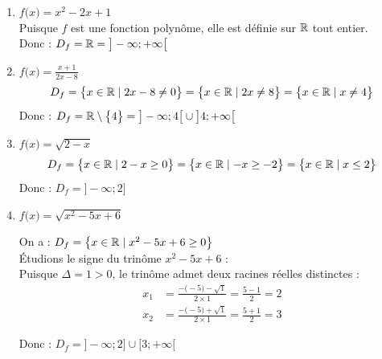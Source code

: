 \documentclass[10pt, a4paper]{article}
\begin{document}
\begin{Solution}[APPLICATION][1]
\begin{enumerate}[leftmargin=*,itemsep=0.5pt]

    \item $f\big( x \big) = x^2 - 2x + 1$ \\
    Puisque $f$ est une fonction polynôme, elle est définie sur $\mathbb{R}$ tout entier. \\
    Donc : \quad $D_f = \mathbb{R} = \big] -\infty ; +\infty \big[ $

    \item  $f\big( x \big) = \frac{x+1}{2x-8}$
         $$D_f = \big\{ x \in \mathbb{R} \mid 2x - 8 \neq 0 \big\} 
             = \big\{ x \in \mathbb{R} \mid 2x  \neq 8 \big\} 
             = \big\{ x \in \mathbb{R} \mid x  \neq 4 \big\}$$
    Donc : \quad $D_f = \mathbb{R} \setminus \big\{ 4 \big\} = \big] -\infty ; 4 \big[ \cup \big] 4 ; +\infty \big[$ 

    \item  $f\big( x \big) = \sqrt{2-x}$
    \begin{align*}
        D_f = \big\{ x \in \mathbb{R} \mid 2 - x \geq 0 \big\}
         = \big\{ x \in \mathbb{R} \mid  - x \geq -2 \big\}
         = \big\{ x \in \mathbb{R} \mid x \leq 2 \big\}
    \end{align*}
    Donc : \quad  $D_f = \big] -\infty ; 2 \big]$ 

    \item $f\big( x \big) = \sqrt{x^2 - 5x + 6}$
    
    On a : \quad $D_f = \big\{ x \in \mathbb{R} \mid x^2 - 5x + 6 \geq 0 \big\}$ \\
    Étudions le signe du trinôme $x^2 - 5x + 6$ : \\
    Puisque $\Delta = 1 > 0$, le trinôme admet deux racines réelles distinctes :
    \begin{align*}
        x_1 &= \frac{-\big( -5 \big) - \sqrt{1}}{2 \times 1} = \frac{5 - 1}{2} = 2 \\
        x_2 &= \frac{-\big( -5 \big) + \sqrt{1}}{2 \times 1} = \frac{5 + 1}{2} = 3
    \end{align*}
\begin{center}
\end{center}
    Donc : \quad $ D_f = \big] -\infty ; 2 \big] \cup \big[ 3 ; +\infty \big[ $


\end{enumerate}
\end{Solution}
\end{document}
